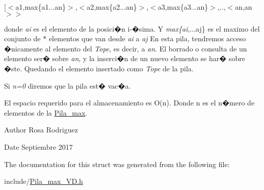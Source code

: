 \begin{DoxyItemize}
\item \mbox{[}$<$a1,max\{a1...an\}$>$,$<$a2,max\{a2...an\}$>$,$<$a3,max\{a3...an\}$>$,..,$<$an,an$>$$>$
\end{DoxyItemize}

donde {\itshape ai} es el elemento de la posici�n i-\/�sima. Y {\itshape max\{ai},...aj\} es el maximo del conjunto de $\ast$ elementos que van desde {\itshape ai} a {\itshape aj} En esta pila, tendremos acceso �nicamente al elemento del {\itshape Tope}, es decir, a {\itshape an}. El borrado o consulta de un elemento ser� sobre {\itshape an}, y la inserci�n de un nuevo elemento se har� sobre �ste. Quedando el elemento insertado como {\itshape Tope} de la pila.

Si {\itshape n=0} diremos que la pila est� vac�a.

El espacio requerido para el almacenamiento es O(n). Donde n es el n�mero de elementos de la \mbox{\hyperlink{classPila__max}{Pila\+\_\+max}}.

\begin{DoxyAuthor}{Author}
Rosa Rodriguez 
\end{DoxyAuthor}
\begin{DoxyDate}{Date}
Septiembre 2017 
\end{DoxyDate}


The documentation for this struct was generated from the following file\+:\begin{DoxyCompactItemize}
\item 
include/\mbox{\hyperlink{Pila__max__VD_8h}{Pila\+\_\+max\+\_\+\+V\+D.\+h}}\end{DoxyCompactItemize}
